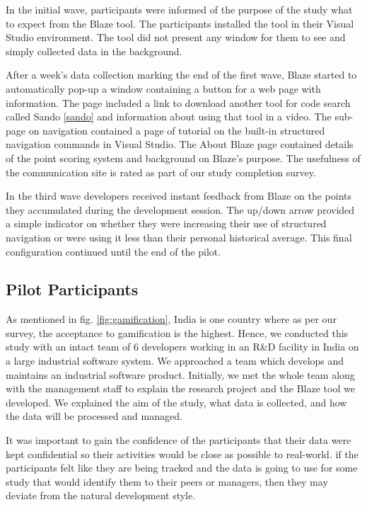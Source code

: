 \documentclass{sig-alternate}
\begin{document}
In the initial wave, participants were informed of the purpose of the study what to expect from the Blaze tool.  The participants installed the tool in their Visual Studio environment.  The tool did not present any window for them to see and simply collected data in the background.   

After a week's data collection marking the end of the first wave, Blaze started to automatically pop-up a window containing a button for a web page with information.  The page included a link to download another tool for code search called Sando \ref{sando} and information about using that tool in a video.  The sub-page on navigation contained a page of tutorial on the built-in structured navigation commands in Visual Studio.  The About Blaze page contained details of the point scoring system and background on Blaze's purpose.  The usefulness of the communication site is rated as part of our study completion survey.

In the third wave developers received instant feedback from Blaze on the points they accumulated during the development session.  The up/down arrow provided a simple indicator on whether they were increasing their use of structured navigation or were using it less than their personal historical average.  This final configuration continued until the end of the pilot.  

\subsection{Pilot Participants}

As mentioned in fig. \ref{fig:gamification}, India is one country where as per our survey, the acceptance to gamification is the highest. Hence, we conducted this study with an intact team of 6 developers working in an R\&D facility in India on a large industrial software system. We approached a team which develops and maintains an industrial software product. Initially, we met the whole team along with the management staff to explain the research project and the Blaze tool we developed. We  explained the aim of the study, what data is collected, and how the data will be processed and managed. 

It was important to gain the confidence of the participants that their data were kept confidential so their activities would be close as possible to real-world. if the participants felt like they are being tracked and the data is going to use for some study that would identify them to their peers or managers, then they may deviate from the natural development style.
\end{document}
